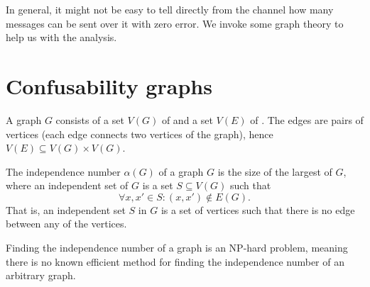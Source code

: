 In general, it might not be easy to tell directly from the channel how many messages can be sent over it with zero error. We invoke some graph theory to help us with the analysis.

\section{Confusability graphs}

\begin{definition}[Graph]
A graph $G$ consists of a set $V(G)$ of  and a set $V(E)$ of . The edges are pairs of vertices (each edge connects two vertices of the graph), hence $V(E) \subseteq V(G) \times V(G)$.
\end{definition}

\begin{definition}
The independence number $\alpha(G)$ of a graph $G$ is the size of the largest  of $G$, where an independent set of $G$ is a set $S \subseteq V(G)$ such that
\[
\forall x, x' \in S: (x,x') \not\in E(G).
\]
That is, an independent set $S$ in $G$ is a set of vertices such that there is no edge between any of the vertices.
\end{definition}
Finding the independence number of a graph is an NP-hard problem, meaning there is no known efficient method for finding the independence number of an arbitrary graph.


